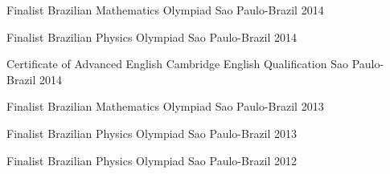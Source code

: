 




\begin{cvhonors}


\cvhonor
{Finalist} %
{Brazilian Mathematics Olympiad} %
{Sao Paulo-Brazil} %
{2014} %

\cvhonor
{Finalist} %
{Brazilian Physics Olympiad} %
{Sao Paulo-Brazil} %
{2014} %

\cvhonor
{Certificate of Advanced English} %
{Cambridge English Qualification} %
{Sao Paulo-Brazil} %
{2014} %

\cvhonor
{Finalist} %
{Brazilian Mathematics Olympiad} %
{Sao Paulo-Brazil} %
{2013} %


\cvhonor
{Finalist} %
{Brazilian Physics Olympiad} %
{Sao Paulo-Brazil} %
{2013} %

\cvhonor
{Finalist} %
{Brazilian Physics Olympiad} %
{Sao Paulo-Brazil} %
{2012} %




\end{cvhonors}


